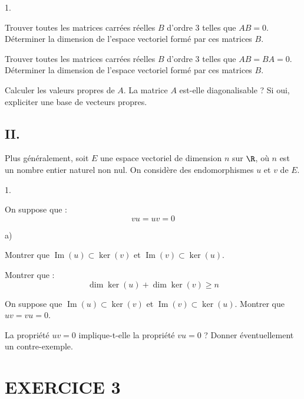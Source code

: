 \documentclass[11pt]{article}%
\begin{document}
\begin{noliste}{1.}
 \setlength{\itemsep}{4mm}
\item Trouver toutes les matrices carrées réelles $B$ d'ordre 3 telles
que $AB = 0$.\\
Déterminer la dimension de l'espace vectoriel formé par ces matrices
$B$.

\item Trouver toutes les matrices carrées réelles $B$ d'ordre 3 telles
que $AB = BA = 0$.\\
Déterminer la dimension de l'espace vectoriel formé par ces matrices
$B$.

\item Calculer les valeurs propres de $A$. La matrice $A$ est-elle
diagonalisable ? Si oui, expliciter une base de vecteurs propres.
\end{noliste}

\subsection*{II.}

Plus généralement, soit $E$ une espace vectoriel de dimension $n$ sur
$\R$, où $n$ est un nombre entier naturel non nul. On considère des
endomorphismes $u$ et $v$ de $E$.

\begin{noliste}{1.}
 \setlength{\itemsep}{4mm}
\item On suppose que : 
\[
vu = uv = 0
\]

\begin{noliste}{a)}
 \setlength{\itemsep}{2mm}
\item Montrer que $\operatorname{Im}(u)\subset \ker (v)$ et
$\operatorname{Im}(v)\subset
\ker (u)$.

\item Montrer que : 
\[
\dim \ker (u) + \dim \ker (v)\geq n
\]
\end{noliste}

\item On suppose que $\operatorname{Im}(u)\subset \ker (v)$ et
$\operatorname{Im}(v)\subset
\ker (u)$. Montrer que $uv = vu = 0$.

\item La propriété $uv = 0$ implique-t-elle la propriété $vu = 0$ ?
Donner éventuellement un contre-exemple.
\end{noliste}

\section*{EXERCICE 3}
\end{document}
